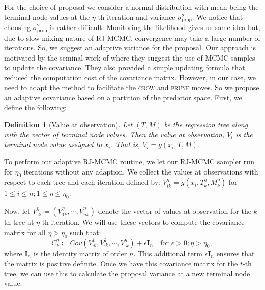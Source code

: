 \documentclass[
12pt]{article}
\newtheorem{definition}{Definition}[section]
\begin{document}
	For the choice of proposal we consider a normal distribution with mean being the terminal node values at the $\eta$-th iteration and variance $\sigma^2_{\text{prop}}$. We notice that choosing $\sigma^2_{\text{prop}}$ is rather difficult. Monitoring the likelihood gives us some idea but, due to slow mixing nature of RJ-MCMC, convergence may take a large number of iterations. So, we suggest an adaptive variance for the proposal. Our approach is motivated by the seminal work of \citet{haario_AMH} where they suggest the use of MCMC samples to update the covariance. They also provided a simple updating formula that reduced the computation cost of the covariance matrix. However, in our case, we need to adapt the method to facilitate the \textsc{grow} and \textsc{prune} moves. So we propose an adaptive covariance based on a partition of the predictor space. First, we define the following:
	\begin{definition}[Value at observation]\label{def:val:at:obs}
		Let $(T,M)$ be the regression tree along with the vector of terminal node values. Then the value at observation, $V_i$ is the terminal node value assigned to $x_i$. That is, $V_i = g(x_i, T,M)$.
	\end{definition}
	
	To perform our adaptive RJ-MCMC routine, we let our RJ-MCMC sampler run for $\eta_0$ iterations without any adaption. We collect the values at observations with respect to each tree and each iteration defined by: $V_{ik}^{\eta} = g\left(x_i,T_k^{\eta},M_k^{\eta}\right)$ for $1\le i \le n; 1\le \eta \le \eta_0$.
	
	Now, let $V_{.k}^{\eta}\coloneq (V_{1k}^{\eta}, \cdots, V_{nk}^{\eta})$ denote the vector of values at observation for the $k$-th tree at $\eta$-th iteration. We will use these vectors to compute the covariance matrix for all $\eta>\eta_0$ such that:
	\begin{equation*}
		C_k^{\eta} \coloneqq Cov\left(V_{\cdot k}^{1},V_{\cdot k}^{2},\cdots,V_{\cdot k}^{\eta}\right) + \epsilon\mathbf{I}_n \quad \text{for } \epsilon>0; \eta>\eta_0,
	\end{equation*}
	where $\mathbf{I}_n$ is the identity matrix of order $n$. This additional term $\epsilon\mathbf{I}_n$ ensures that the matrix is positive definite. Once we have this covariance matrix for the $t$-th tree, we can use this to calculate the proposal variance at a new terminal node value.
	
\end{document}
